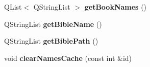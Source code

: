 \begin{CompactItemize}
\item 
\hypertarget{classSettings_0b510a4216bf2619147b3da503208361}{
QList$<$ QStringList $>$ \textbf{getBookNames} ()}
\label{classSettings_0b510a4216bf2619147b3da503208361}

\item 
\hypertarget{classSettings_29df1fac942be48b89a199477e18ad9a}{
QStringList \textbf{getBibleName} ()}
\label{classSettings_29df1fac942be48b89a199477e18ad9a}

\item 
\hypertarget{classSettings_fdd99319b04b1dad6de2dbcb87650365}{
QStringList \textbf{getBiblePath} ()}
\label{classSettings_fdd99319b04b1dad6de2dbcb87650365}

\item 
\hypertarget{classSettings_742208f6ac5589af5acfcd6dbf6b4939}{
void \textbf{clearNamesCache} (const int \&id)}
\label{classSettings_742208f6ac5589af5acfcd6dbf6b4939}

\end{CompactItemize}
